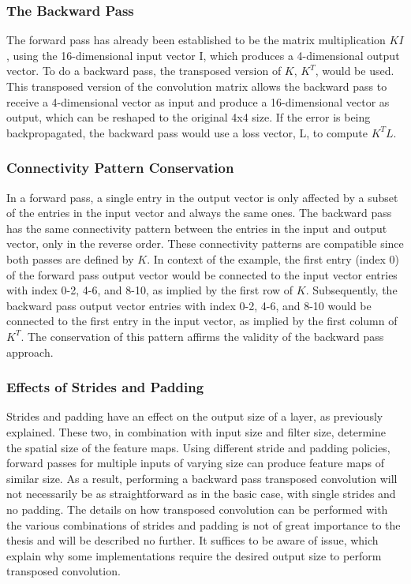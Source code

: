\subsubsection{The Backward Pass}

The forward pass has already been established to be the matrix multiplication $KI$, using the 16-dimensional input vector I, which produces a 4-dimensional output vector. To do a backward pass, the transposed version of $K$, $K^T$, would be used. This transposed version of the convolution matrix allows the backward pass to receive a 4-dimensional vector as input and produce a 16-dimensional vector as output, which can be reshaped to the original 4x4 size. If the error is being backpropagated, the backward pass would use a loss vector, L, to compute $K^T L$. 

\subsubsection{Connectivity Pattern Conservation}

In a forward pass, a single entry in the output vector is only affected by a subset of the entries in the input vector and always the same ones. The backward pass has the same connectivity pattern between the entries in the input and output vector, only in the reverse order. These connectivity patterns are compatible since both passes are defined by $K$. In context of the example, the first entry (index 0) of the forward pass output vector would be connected to the input vector entries with index 0-2, 4-6, and 8-10, as implied by the first row of $K$. Subsequently, the backward pass output vector entries with index 0-2, 4-6, and 8-10 would be connected to the first entry in the input vector, as implied by the first column of $K^T$. The conservation of this pattern affirms the validity of the backward pass approach.

\subsubsection{Effects of Strides and Padding}

Strides and padding have an effect on the output size of a layer, as previously explained. These two, in combination with input size and filter size, determine the spatial size of the feature maps. Using different stride and padding policies, forward passes for multiple inputs of varying size can produce feature maps of similar size. As a result, performing a backward pass transposed convolution will not necessarily be as straightforward as in the basic case, with single strides and no padding. The details on how transposed convolution can be performed with the various combinations of strides and padding is not of great importance to the thesis and will be described no further. It suffices to be aware of issue, which explain why some implementations require the desired output size to perform transposed convolution.

